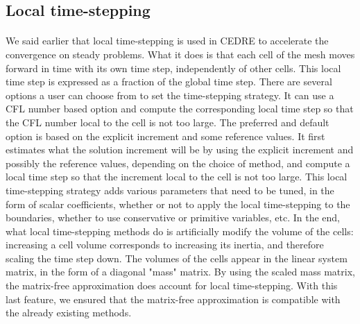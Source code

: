     \subsection{Local time-stepping}

      \paragraph{}
      We said earlier that local time-stepping is used in CEDRE to accelerate the convergence on steady problems.
      What it does is that each cell of the mesh moves forward in time with its own time step, independently of other cells.
      This local time step is expressed as a fraction of the global time step.
      There are several options a user can choose from to set the time-stepping strategy.
      It can use a CFL number based option and compute the corresponding local time step so that the CFL number local to the cell is not too large.
      The preferred and default option is based on the explicit increment and some reference values.
      It first estimates what the solution increment will be by using the explicit increment and possibly the reference values, depending on the choice of method, and compute a local time step so that the increment local to the cell is not too large.
      This local time-stepping strategy adds various parameters that need to be tuned, in the form of scalar coefficients, whether or not to apply the local time-stepping to the boundaries, whether to use conservative or primitive variables, etc.
      In the end, what local time-stepping methods do is artificially modify the volume of the cells: increasing a cell volume corresponds to increasing its inertia, and therefore scaling the time step down.
      The volumes of the cells appear in the linear system matrix, in the form of a diagonal "mass" matrix.
      By using the scaled mass matrix, the matrix-free approximation does account for local time-stepping.
      With this last feature, we ensured that the matrix-free approximation is compatible with the already existing methods.



